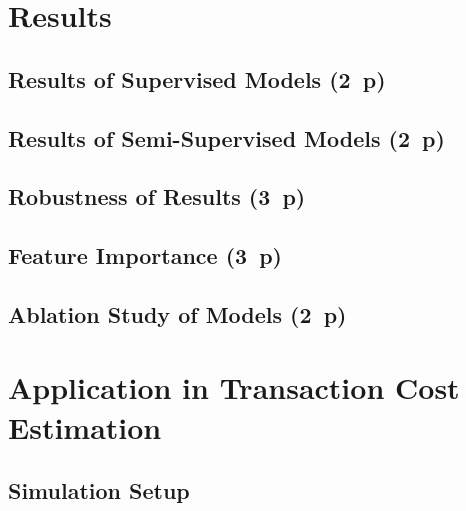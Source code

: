 \newpage
\section{Results}\label{sec:results}



% 

% 


% 

\subsection{Results of Supervised
    Models (2~p)}\label{sec:results-of-supervised-models}

\subsection{Results of Semi-Supervised
    Models (2~p)}\label{sec:results-of-semi-supervised-models}

\subsection{Robustness of Results (3~p)}\label{sec:robustness-checks}

\subsection{Feature Importance (3~p)}\label{sec:feature-importance}

\subsection{Ablation Study of Models (2~p)}\label{sec:ablation-study}

\newpage
\section{Application in Transaction Cost Estimation}\label{sec:application}
\subsection{Simulation Setup}\label{sec:simulation-setup}

